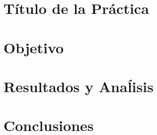 \documentclass[12pt, letterpaper]{article}
\begin{document}



\normalsize

\section*{\centering \fontsize{14}{17}\sffamily\selectfont Título de la Práctica}

\section*{\centering \fontsize{14}{17}\sffamily\selectfont Objetivo}

\section*{\centering \fontsize{14}{17}\sffamily\selectfont Resultados y Anaĺisis}

\section*{\centering \fontsize{14}{17}\sffamily\selectfont Conclusiones}

% 
\end{document}
